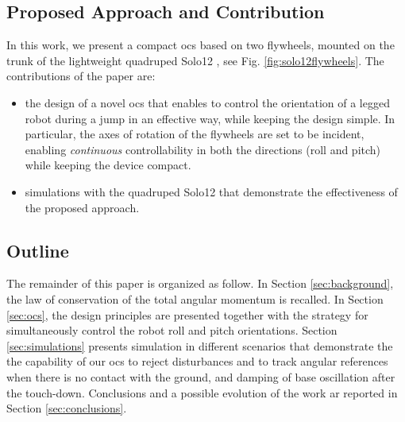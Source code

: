\documentclass[sensors,article,submit,pdftex,moreauthors]{Definitions/mdpi}
\begin{document}
\subsection{Proposed Approach and Contribution}
In this work, we present a compact \gls{ocs} based on two flywheels, mounted on the trunk of the lightweight quadruped Solo12 \cite{grimminger2020open}, see Fig. \ref{fig:solo12flywheels}.
The contributions of the paper are:
\begin{itemize}
	\item the design of a novel \gls{ocs} that enables to control the orientation of a legged robot during a jump in an effective way, while keeping the design simple. 
	In particular, the axes of rotation of the flywheels are set to be incident, enabling \textit{continuous} controllability in both the directions (roll and pitch) while keeping the device compact.
	\item simulations  with the quadruped Solo12 that demonstrate the effectiveness of the proposed approach.
\end{itemize}



\subsection{Outline}
The remainder of this paper is organized as follow. In Section \ref{sec:background}, the law of conservation of the total angular momentum is recalled. In Section \ref{sec:ocs}, the design principles are presented together with the strategy for simultaneously control the robot roll and pitch orientations. Section \ref{sec:simulations} presents simulation in different scenarios that demonstrate the the capability of our \gls{ocs} to reject disturbances and to track angular references when there is no contact with the ground, and damping of base oscillation after the touch-down. Conclusions and a possible evolution of the work ar reported in Section \ref{sec:conclusions}.
\end{document}
